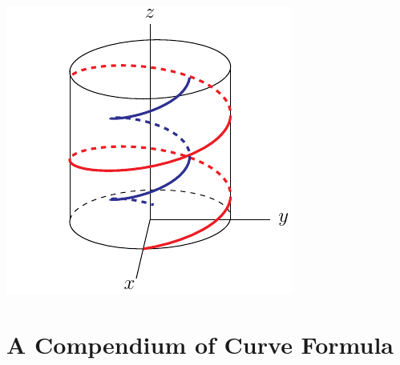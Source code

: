 \begin{eg}
\begin{nfig}
\begin{center}
    \includegraphics{helix6.pdf}
\end{center}
\end{nfig}

\end{eg}



\section{A Compendium of Curve Formula}\label{sec:CurveCompendium}


